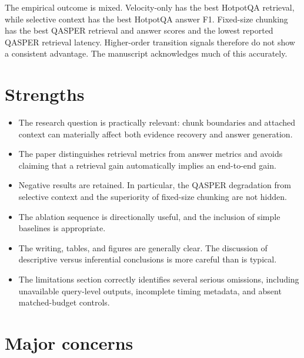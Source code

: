 \documentclass[11pt]{article}
\begin{document}
The empirical outcome is mixed. Velocity-only has the best HotpotQA retrieval, while selective context has the best HotpotQA answer F1. Fixed-size chunking has the best QASPER retrieval and answer scores and the lowest reported QASPER retrieval latency. Higher-order transition signals therefore do not show a consistent advantage. The manuscript acknowledges much of this accurately.

\section*{Strengths}

\begin{itemize}
  \item The research question is practically relevant: chunk boundaries and attached context can materially affect both evidence recovery and answer generation.
  \item The paper distinguishes retrieval metrics from answer metrics and avoids claiming that a retrieval gain automatically implies an end-to-end gain.
  \item Negative results are retained. In particular, the QASPER degradation from selective context and the superiority of fixed-size chunking are not hidden.
  \item The ablation sequence is directionally useful, and the inclusion of simple baselines is appropriate.
  \item The writing, tables, and figures are generally clear. The discussion of descriptive versus inferential conclusions is more careful than is typical.
  \item The limitations section correctly identifies several serious omissions, including unavailable query-level outputs, incomplete timing metadata, and absent matched-budget controls.
\end{itemize}

\section*{Major concerns}
\end{document}
